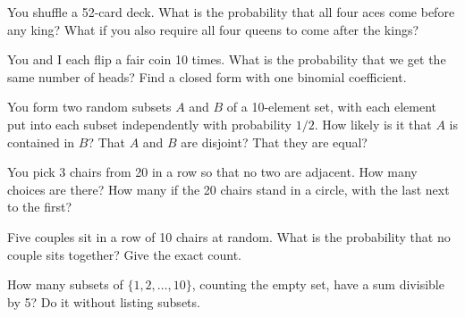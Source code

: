 \begin{question}\label{iq:iv1:counting-and-symmetry:24}
You shuffle a 52-card deck. What is the probability that all four aces come before any king? What if you also require all four queens to come after the kings?
\end{question}

\begin{question}\label{iq:iv1:counting-and-symmetry:25}
You and I each flip a fair coin 10 times. What is the probability that we get the same number of heads? Find a closed form with one binomial coefficient.
\end{question}

\begin{question}\label{iq:iv1:counting-and-symmetry:26}
You form two random subsets $A$ and $B$ of a 10-element set, with each element put into each subset independently with probability $1/2$. How likely is it that $A$ is contained in $B$? That $A$ and $B$ are disjoint? That they are equal?
\end{question}

\begin{question}\label{iq:iv1:counting-and-symmetry:27}
You pick 3 chairs from 20 in a row so that no two are adjacent. How many choices are there? How many if the 20 chairs stand in a circle, with the last next to the first?
\end{question}

\begin{question}\label{iq:iv1:counting-and-symmetry:28}
Five couples sit in a row of 10 chairs at random. What is the probability that no couple sits together? Give the exact count.
\end{question}

\begin{question}\label{iq:iv1:counting-and-symmetry:29}
How many subsets of $\{1, 2, \dots, 10\}$, counting the empty set, have a sum divisible by 5? Do it without listing subsets.
\end{question}

